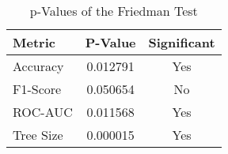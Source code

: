 
    \begin{table}[h]
        \centering
        \renewcommand{\arraystretch}{1.2}
    \begin{tabular}{lcc}
\toprule
Metric & P-Value & Significant \\
\midrule
Accuracy & 0.012791 & Yes \\
F1-Score & 0.050654 & No \\
ROC-AUC & 0.011568 & Yes \\
Tree Size & 0.000015 & Yes \\
\bottomrule
\end{tabular}

        \caption{p-Values of the Friedman Test}
        \label{tab:fitness_friedman}
    \end{table}
    